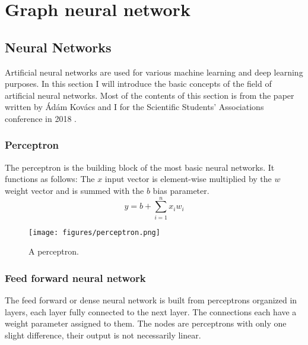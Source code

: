 \chapter{Graph neural network}\label{sect:GraphNetwork}

\section{Neural Networks}

Artificial neural networks are used for various machine learning and deep learning purposes. In this section I will introduce the basic concepts of the field of artificial neural networks.
Most of the contents of this section is from the paper written by \'Ad\'am Kov\'acs and I for the Scientific Students' Associations conference in 2018 \cite{SemParse}.

\subsection{Perceptron}
The perceptron is the building block of the most basic neural networks. It functions as follows: The \(x\) input vector is element-wise multiplied by the \(w\) weight vector and is summed with the \(b\) bias parameter.
\[y = b + \sum_{i=1}^{n} x_i w_i\]

\begin{figure}[!ht]
	\centering
	\texttt{[image: figures/perceptron.png]}
	\caption{A perceptron.}
	\label{fig:perceptron}
\end{figure}

\subsection{Feed forward neural network}

The feed forward or dense neural network is built from perceptrons organized in layers, each layer fully connected to the next layer. The connections each have a weight parameter assigned to them. The nodes are perceptrons with only one slight difference, their output is not necessarily linear.

